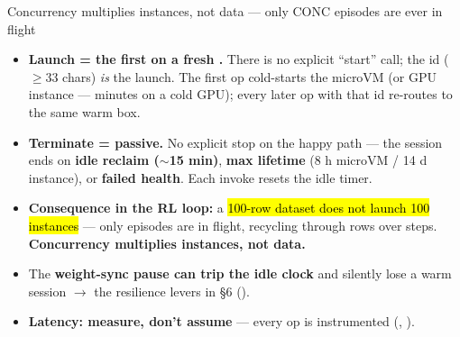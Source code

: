 \begin{frame}{Concurrency multiplies instances, not data --- only CONC episodes are ever in flight}
\begin{itemize}\footnotesize\setlength{\itemsep}{1.8mm}
\item \textbf{Launch = the first  on a fresh .} There is no explicit ``start'' call; the id ($\ge$33 chars) \emph{is} the launch. The first op cold-starts the microVM (or GPU instance --- minutes on a cold GPU); every later op with that id re-routes to the same warm box.
\item \textbf{Terminate = passive.} No explicit stop on the happy path --- the session ends on \textbf{idle reclaim ($\sim$15 min)}, \textbf{max lifetime} (8 h microVM / 14 d instance), or \textbf{failed health}. Each invoke resets the idle timer.
\item \textbf{Consequence in the RL loop:} a \hl{100-row dataset does not launch 100 instances} --- only  episodes are in flight, recycling through rows over steps. \textbf{Concurrency multiplies instances, not data.}
\item The \textbf{weight-sync pause can trip the idle clock} and silently lose a warm session $\rightarrow$ the resilience levers in \S6 ().
\item \textbf{Latency: measure, don't assume} --- every op is instrumented (, ).
\end{itemize}
\end{frame}

